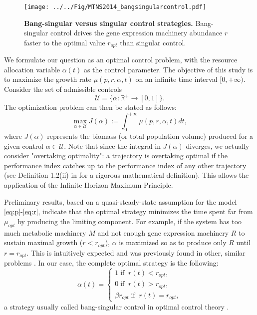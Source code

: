 \documentclass[a4paper, 10pt, conference]{ieeeconf}      %
\begin{document}
\begin{figure*}[htpb]
\centering
\texttt{[image: ../../Fig/MTNS2014\_bangsingularcontrol.pdf]}
\caption{\textbf{Bang-singular versus singular control strategies.}
Bang-singular control drives the gene expression machinery abundance $r$ faster to the optimal value $r_{opt}$ than singular control.
}
\label{fig::simul}
\end{figure*}

We formulate our question as an optimal control problem, with the resource allocation variable $\alpha(t)$ as the control parameter.
The objective of this study is to maximize the growth rate $\mu(p,r, \alpha, t)$ on an infinite time interval $[0, +\infty)$.
Consider the set of admissible controls
\[
\mathcal{U}=\{\alpha:\mathbb{R}^+ \rightarrow [0,1] \}.
\]
The optimization problem can then be stated as follows:
\begin{equation}\label{Prob}
\max_{\alpha \in \mathcal{U}} J(\alpha):=\int_0^{+\infty} \mu(p, r, \alpha, t) dt,
\end{equation}
where $J(\alpha)$ represents the biomass (or total population volume) produced for a given control $\alpha \in \mathcal{U}$.
Note that since the integral in $J(\alpha)$ diverges, we actually consider "overtaking optimality":
a trajectory is overtaking optimal if the performance index catches up to the performance index of any other trajectory (see Definition 1.2(ii) in \cite{carlson1991} for a rigorous mathematical definition).
This allows the application of the Infinite Horizon Maximum Principle. 

Preliminary results, based on a quasi-steady-state assumption for the model \eqref{eq:p}-\eqref{eq:r}, indicate that the optimal strategy minimizes the time spent far from $\mu_{opt}$ by producing the limiting component.
For example, if the system has too much metabolic machinery $M$ and not enough gene expression machinery $R$ to sustain maximal growth ($r < r_{opt}$), $\alpha$ is maximized so as to produce only $R$ until $r = r_{opt}$.
This is intuitively expected and was previously found in other, similar problems \cite{pavlov_optimal_2013,berg_optimal_1998, berg_optimal_2002}. In our case, the complete optimal strategy is the following:
\begin{equation}
\alpha(t) = 
\begin{cases}
1 \; \text{if} \;\; r(t)<r_{opt},\\
0 \; \text{if} \;\; r(t)>r_{opt},\\
\beta r_{opt} \; \text{if} \;\; r(t)=r_{opt},
\end{cases}
\label{optstrat}
\end{equation}
a strategy usually called bang-singular control in optimal control theory \cite{bryson_applied_1975}. 
\end{document}
